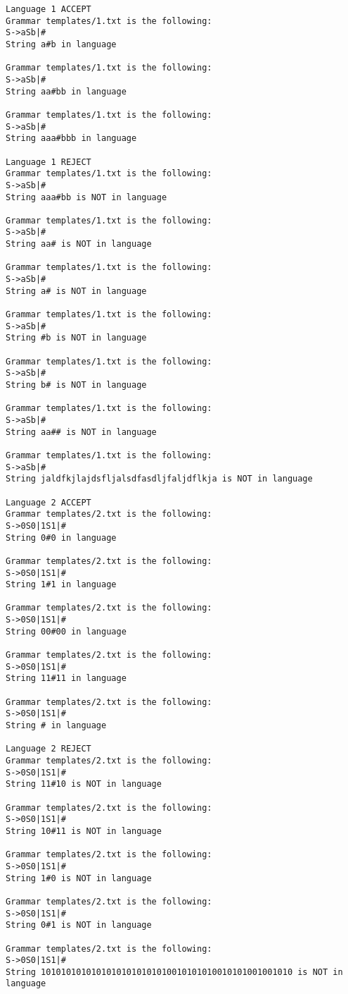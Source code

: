 \documentclass{article}
\begin{document}
\begin{lstlisting}
Language 1 ACCEPT
Grammar templates/1.txt is the following:
S->aSb|#
String a#b in language

Grammar templates/1.txt is the following:
S->aSb|#
String aa#bb in language

Grammar templates/1.txt is the following:
S->aSb|#
String aaa#bbb in language

Language 1 REJECT
Grammar templates/1.txt is the following:
S->aSb|#
String aaa#bb is NOT in language

Grammar templates/1.txt is the following:
S->aSb|#
String aa# is NOT in language

Grammar templates/1.txt is the following:
S->aSb|#
String a# is NOT in language

Grammar templates/1.txt is the following:
S->aSb|#
String #b is NOT in language

Grammar templates/1.txt is the following:
S->aSb|#
String b# is NOT in language

Grammar templates/1.txt is the following:
S->aSb|#
String aa## is NOT in language

Grammar templates/1.txt is the following:
S->aSb|#
String jaldfkjlajdsfljalsdfasdljfaljdflkja is NOT in language

Language 2 ACCEPT
Grammar templates/2.txt is the following:
S->0S0|1S1|#
String 0#0 in language

Grammar templates/2.txt is the following:
S->0S0|1S1|#
String 1#1 in language

Grammar templates/2.txt is the following:
S->0S0|1S1|#
String 00#00 in language

Grammar templates/2.txt is the following:
S->0S0|1S1|#
String 11#11 in language

Grammar templates/2.txt is the following:
S->0S0|1S1|#
String # in language

Language 2 REJECT
Grammar templates/2.txt is the following:
S->0S0|1S1|#
String 11#10 is NOT in language

Grammar templates/2.txt is the following:
S->0S0|1S1|#
String 10#11 is NOT in language

Grammar templates/2.txt is the following:
S->0S0|1S1|#
String 1#0 is NOT in language

Grammar templates/2.txt is the following:
S->0S0|1S1|#
String 0#1 is NOT in language

Grammar templates/2.txt is the following:
S->0S0|1S1|#
String 10101010101010101010101010010101010010101001001010 is NOT in language


\end{lstlisting}
\end{document}
